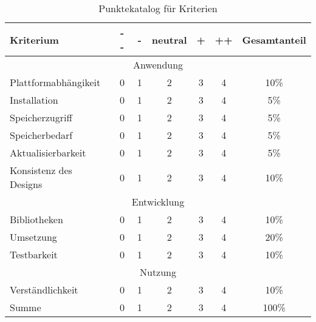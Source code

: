 \begin{table}[h]
    \centering
    \begin{tabularx}{\textwidth}{|l||c|c|c|c|c|c|}
        \hline
        Kriterium & - - & - & neutral & + &++& Gesamtanteil \\
        \hline
    		\multicolumn{7}{c}{Anwendung}\\
    	\hline
        Plattformabhängikeit & 0 & 1 & 2 & 3 & 4 & 10\%\\
        Installation  		& 0 & 1 & 2 & 3 & 4 & 5\%\\
        Speicherzugriff		& 0 & 1 & 2 & 3 & 4 & 5\%\\        
        Speicherbedarf 		& 0 & 1 & 2 & 3 & 4 & 5\%\\
        Aktualisierbarkeit 	& 0 & 1 & 2 & 3 & 4 & 5\%\\
        Konsistenz des Designs 	& 0 & 1 & 2 & 3 & 4 & 10\%\\

		\hline
			\multicolumn{7}{c}{Entwicklung}\\
		\hline
		Bibliotheken	& 0 & 1 & 2 & 3 & 4 & 10\%\\
		Umsetzung	& 0 & 1 & 2 & 3 & 4 & 20\%\\
		Testbarkeit	& 0 & 1 & 2 & 3 & 4 & 10\%\\

        \hline
        	\multicolumn{7}{c}{Nutzung}\\
        \hline
        Verständlichkeit	& 0 & 1 & 2 & 3 & 4 & 10\%\\
        \hline
        
        \hline
        Summe 				& 0 & 1 & 2 & 3 & 4 & 100\%\\
        \hline


    \end{tabularx}
    \caption{Punktekatalog für Kriterien} \label{tab:punktekatalog}
\end{table}

